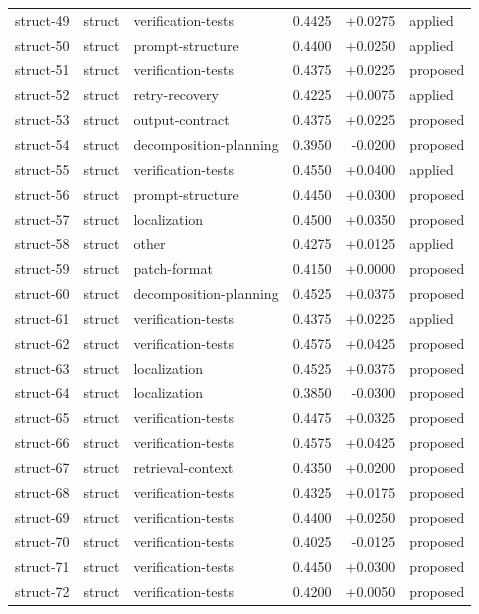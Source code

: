 \begin{center}
\begin{longtable}{llp{5.2cm}rrl}
struct-49 & struct & verification-tests & 0.4425 & +0.0275 & applied \\
struct-50 & struct & prompt-structure & 0.4400 & +0.0250 & applied \\
struct-51 & struct & verification-tests & 0.4375 & +0.0225 & proposed \\
struct-52 & struct & retry-recovery & 0.4225 & +0.0075 & applied \\
struct-53 & struct & output-contract & 0.4375 & +0.0225 & proposed \\
struct-54 & struct & decomposition-planning & 0.3950 & -0.0200 & proposed \\
struct-55 & struct & verification-tests & 0.4550 & +0.0400 & applied \\
struct-56 & struct & prompt-structure & 0.4450 & +0.0300 & proposed \\
struct-57 & struct & localization & 0.4500 & +0.0350 & proposed \\
struct-58 & struct & other & 0.4275 & +0.0125 & applied \\
struct-59 & struct & patch-format & 0.4150 & +0.0000 & proposed \\
struct-60 & struct & decomposition-planning & 0.4525 & +0.0375 & proposed \\
struct-61 & struct & verification-tests & 0.4375 & +0.0225 & applied \\
struct-62 & struct & verification-tests & 0.4575 & +0.0425 & proposed \\
struct-63 & struct & localization & 0.4525 & +0.0375 & proposed \\
struct-64 & struct & localization & 0.3850 & -0.0300 & proposed \\
struct-65 & struct & verification-tests & 0.4475 & +0.0325 & proposed \\
struct-66 & struct & verification-tests & 0.4575 & +0.0425 & proposed \\
struct-67 & struct & retrieval-context & 0.4350 & +0.0200 & proposed \\
struct-68 & struct & verification-tests & 0.4325 & +0.0175 & proposed \\
struct-69 & struct & verification-tests & 0.4400 & +0.0250 & proposed \\
struct-70 & struct & verification-tests & 0.4025 & -0.0125 & proposed \\
struct-71 & struct & verification-tests & 0.4450 & +0.0300 & proposed \\
struct-72 & struct & verification-tests & 0.4200 & +0.0050 & proposed \\

\end{longtable}
\end{center}
